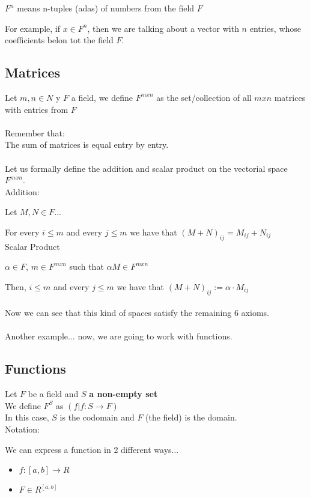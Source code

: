 \documentclass{article}
\begin{document}
\(F^n\) means n-tuples (adas) of numbers from the field \(F\)

For example, if \(x \in F^n\), then we are talking about a vector with \(n\) entries, whose coefficients belon tot the field \(F\).
\\
\subsection*{Matrices}
Let \(m,n \in N\) y \(F\) a field, we define \(F^{mxn}\) as the set/collection of all \(m x n\) matrices with entries from \(F\)
\\
\\
Remember that:
\\
The sum of matrices is equal entry by entry.
\\
\\
Let us formally define the addition and scalar product on the vectorial space \(F^{mxn}\).
\\

Addition:

Let \(M, N \in F\)...

For every \(i \leq m\) and every \(j \leq m\) we have that \((M + N)_{ij} = M_{ij} + N_{ij}\)
\\

Scalar Product

\(\alpha \in F\), \(m \in F^{mxn}\) such that \(\alpha M \in F^{mxn}\)

Then, \(i \leq m\) and every \(j \leq m\) we have that \((M + N)_{ij} := \alpha \cdot M_{ij}\)
\\
\\
Now we can see that this kind of spaces satisfy the remaining 6 axioms.
\\
\\
Another example... now, we are going to work with functions.

\subsection*{Functions}
Let \(F\) be a field and \(S\) \textbf{a non-empty set}
\\
We define \(F^S\) as \((f | f: S \rightarrow F)\)
\\
In this case, \(S\) is the codomain and \(F\) (the field) is the domain.
\\

Notation:

We can express a function in 2 different ways...
\begin{itemize}
    \item \(f : [a,b] \rightarrow R\)
    \item \(F \in R^{[a,b]}\)
\end{itemize}
\end{document}
